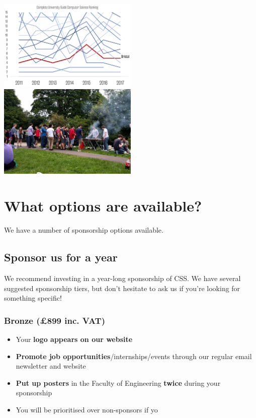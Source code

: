 \documentclass[]{article}
\begin{document}
\includegraphics[width=0.5\textwidth]{ranking-chart}  \includegraphics[width=0.5\textwidth]{bbq}

\section*{What options are available?}

We have a number of sponsorship options available. 

\subsection*{Sponsor us for a year}

We recommend investing in a year-long sponsorship of CSS. We have several suggested sponsorship tiers, but don't hesitate to ask us if you're looking for something specific!

\subsubsection*{Bronze {\color{DarkGoldenrod}(\pounds 899 inc. VAT)}}

\begin{itemize}
	\item Your \textbf{logo appears on our website}
	\item \textbf{Promote job opportunities}/internships/events through our regular email newsletter and website
	\item \textbf{Put up posters} in the Faculty of Engineering \textbf{twice} during your sponsorship
    \item You will be prioritised over non-sponsors if yo
\end{itemize}
\end{document}
